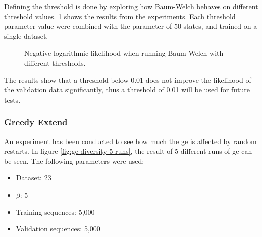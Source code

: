 Defining the threshold is done by exploring how Baum-Welch behaves on different threshold values. \ref{fig:threshold} shows the results from the experiments. Each threshold parameter value were combined with the parameter of 50 states, and trained on a single dataset.

\begin{figure}
\centering
\caption{Negative logarithmic likelihood when running Baum-Welch with different thresholds.}
\label{fig:threshold}
\end{figure}

The results show that a threshold below 0.01 does not improve the likelihood of the validation data significantly, thus a threshold of 0.01 will be used for future tests.

\subsubsection{Greedy Extend}
An experiment has been conducted to see how much the \gls{ge} is affected by random restarts.
In figure \ref{fig:ge-diversity-5-runs}, the result of 5 different runs of \gls{ge} can be seen.
The following parameters were used:
\begin{itemize}
\item Dataset: 23
\item $\beta$: 5
\item Training sequences: 5,000
\item Validation sequences: 5,000
\end{itemize}

